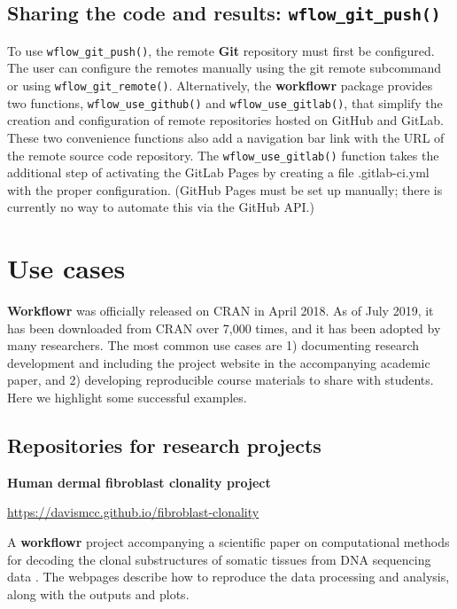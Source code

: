 \documentclass[9pt,a4paper]{extarticle}
\begin{document}
\subsection*{Sharing the code and results: \texttt{wflow\_git\_push()}}

To use \texttt{wflow\_git\_push()}, the remote \textbf{Git} repository must first be
configured. The user can configure the remotes manually using the git
remote subcommand or using \texttt{wflow\_git\_remote()}. Alternatively, the
 \textbf{workflowr} package provides two functions, \texttt{wflow\_use\_github()} and
\texttt{wflow\_use\_gitlab()}, that simplify the creation and configuration of
remote repositories hosted on GitHub and GitLab. These two convenience
functions also add a navigation bar link with the URL of the remote
source code repository. The \texttt{wflow\_use\_gitlab()} function takes the
additional step of activating the GitLab Pages by creating a file
.gitlab-ci.yml with the proper configuration. (GitHub Pages must be set
up manually; there is currently no way to automate this via the GitHub
API.)


\section*{Use cases}

 \textbf{Workflowr} was officially released on CRAN in April 2018. As of July
2019, it has been downloaded from CRAN over 7,000 times, and it has been
adopted by many researchers. The most common use cases are 1)
documenting research development and including the project website in
the accompanying academic paper, and 2) developing reproducible course
materials to share with students. Here we highlight some successful
examples.

\subsection*{Repositories for research projects}

\textbf{Human dermal fibroblast clonality project}

\url{https://davismcc.github.io/fibroblast-clonality}

A \textbf{workflowr} project accompanying a scientific paper on computational
methods for decoding the clonal substructures of somatic tissues from
DNA sequencing data \cite{McCarthy2018}. The webpages describe how to
reproduce the data processing and analysis, along with the outputs and
plots.
\end{document}
